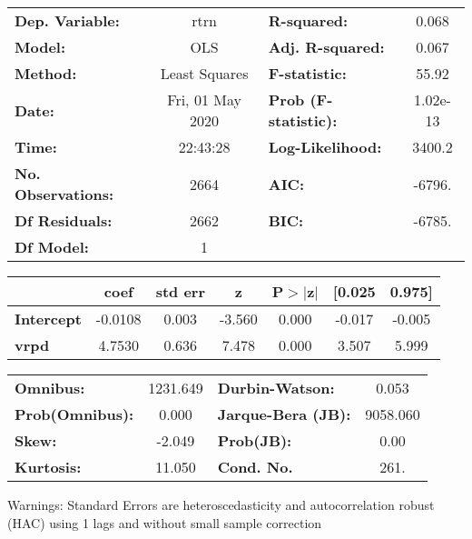 \begin{center}
\begin{tabular}{lclc}
\toprule
\textbf{Dep. Variable:}    &       rtrn       & \textbf{  R-squared:         } &     0.068   \\
\textbf{Model:}            &       OLS        & \textbf{  Adj. R-squared:    } &     0.067   \\
\textbf{Method:}           &  Least Squares   & \textbf{  F-statistic:       } &     55.92   \\
\textbf{Date:}             & Fri, 01 May 2020 & \textbf{  Prob (F-statistic):} &  1.02e-13   \\
\textbf{Time:}             &     22:43:28     & \textbf{  Log-Likelihood:    } &    3400.2   \\
\textbf{No. Observations:} &        2664      & \textbf{  AIC:               } &    -6796.   \\
\textbf{Df Residuals:}     &        2662      & \textbf{  BIC:               } &    -6785.   \\
\textbf{Df Model:}         &           1      & \textbf{                     } &             \\
\bottomrule
\end{tabular}
\begin{tabular}{lcccccc}
                   & \textbf{coef} & \textbf{std err} & \textbf{z} & \textbf{P$> |$z$|$} & \textbf{[0.025} & \textbf{0.975]}  \\
\midrule
\textbf{Intercept} &      -0.0108  &        0.003     &    -3.560  &         0.000        &       -0.017    &       -0.005     \\
\textbf{vrpd}      &       4.7530  &        0.636     &     7.478  &         0.000        &        3.507    &        5.999     \\
\bottomrule
\end{tabular}
\begin{tabular}{lclc}
\textbf{Omnibus:}       & 1231.649 & \textbf{  Durbin-Watson:     } &    0.053  \\
\textbf{Prob(Omnibus):} &   0.000  & \textbf{  Jarque-Bera (JB):  } & 9058.060  \\
\textbf{Skew:}          &  -2.049  & \textbf{  Prob(JB):          } &     0.00  \\
\textbf{Kurtosis:}      &  11.050  & \textbf{  Cond. No.          } &     261.  \\
\bottomrule
\end{tabular}
\end{center}

Warnings: \newline
 [1] Standard Errors are heteroscedasticity and autocorrelation robust (HAC) using 1 lags and without small sample correction